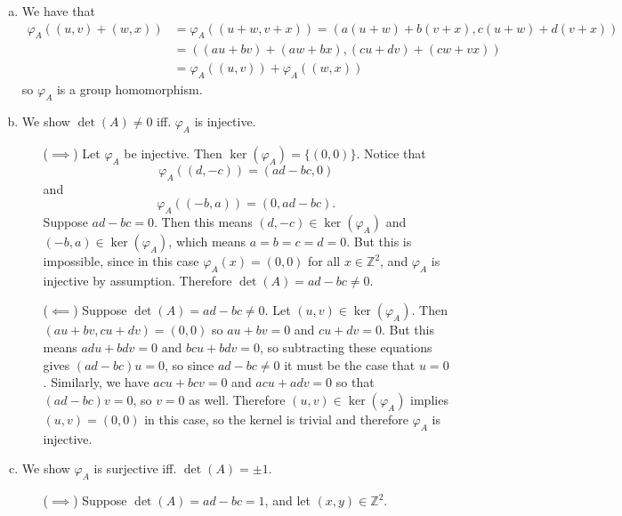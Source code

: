 \documentclass{article}
\begin{document}
\begin{Answer}
\begin{enumerate}[(a)]
  \item{
    We have that
    \begin{align*}
    \varphi_A((u, v) + (w, x)) &=
      \varphi_A((u + w, v + x)) =
      (a(u + w) + b(v + x), c(u + w) + d(v + x)) \\
      &= ((au + bv) + (aw + bx), (cu + dv) + (cw + vx)) \\
      &= \varphi_A((u, v)) + \varphi_A((w, x))
    \end{align*}
    so $\varphi_A$ is a group homomorphism.
  }
  \item{
    We show $\det(A) \neq 0$ iff. $\varphi_A$ is injective.
    \begin{itemize}
      \item[($\implies$)]
      {
        Let $\varphi_A$ be injective. Then
        $\ker(\varphi_A) = \{(0, 0)\}$. Notice that
        $$
        \varphi_A((d, -c)) = (ad - bc, 0)
        $$
        and
        $$
        \varphi_A((-b, a)) = (0, ad - bc).
        $$
        Suppose $ad - bc = 0$. Then this means
        $(d, -c) \in \ker(\varphi_A)$ and $(-b, a) \in \ker(\varphi_A)$,
        which means $a = b = c = d = 0$. But this is impossible, since in
        this case $\varphi_A(x) = (0, 0)$ for all $x \in \mathbb{Z}^2$,
        and $\varphi_A$ is injective by assumption. Therefore
        $\det(A) = ad - bc \neq 0$.
      }
      \item[($\impliedby$)]
      {
        Suppose $\det(A) = ad - bc \neq 0$. Let $(u, v) \in
        \ker(\varphi_A)$. Then $(au + bv, cu + dv) = (0, 0)$
        so $au + bv = 0$ and $cu + dv = 0$. But this means
        $adu + bdv = 0$ and $bcu + bdv = 0$, so subtracting these
        equations gives $(ad - bc)u = 0$, so since $ad - bc \neq 0$ it
        must be the case that $u = 0$. Similarly, we have
        $acu + bcv = 0$ and $acu + adv = 0$ so that $(ad - bc)v = 0$, so
        $v = 0$ as well. Therefore $(u, v) \in \ker(\varphi_A)$ implies
        $(u, v) = (0, 0)$ in this case, so the kernel is trivial and
        therefore $\varphi_A$ is injective.
      }
    \end{itemize}
  }
  \item
  {
    We show $\varphi_A$ is surjective iff. $\det(A) = \pm 1$.
    \begin{itemize}
      \item[($\implies$)]
      {
        Suppose $\det(A) = ad - bc = 1$, and let $(x, y) \in
        \mathbb{Z}^2$.
}
\end{itemize}}
\end{enumerate}
\end{Answer}
\end{document}
